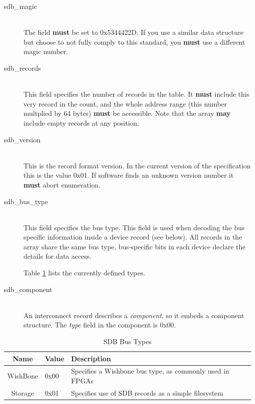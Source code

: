 \documentclass[a4paper, 12pt]{article}
\begin{document}
\begin{description}
\item[sdb\_magic] \hfill \\
The field \textbf{must} be set to 0x5344422D. If you use a similar data structure but
choose to not fully comply to this standard, you \textbf{must} use a different magic
number.

\item[sdb\_records] \hfill \\
This field specifies the number of records in the table. It \textbf{must} include
this very record in the count, and the whole address range (this number multplied by 64 bytes)
\textbf{must} be accessible. Note that the array \textbf{may} include empty records at any position.

\item[sdb\_version] \hfill \\
This is the record format version. In the current version of the specification this is the
value 0x01. If software finds an unknown version number it \textbf{must} abort enumeration.

\item[sdb\_bus\_type] \hfill \\
This field specifies the bus type. This field is used when decoding the bus specific information
inside a device record (see below).  All records in the array share the same
bus type, bus-specific bits in each device declare the details for data access.

Table \ref{bus_type} lists the currently defined types.

\item[sdb\_component] \hfill \\
An interconnect record describes a \textit{component}, so it embeds a component structure.
The \textit{type} field in the component is 0x00.
\end{description}


\begin{center}
  \begin{savenotes}
    \begin{table}[!ht]\footnotesize
      \caption{SDB Bus Types}\label{bus_type}\centering
        \begin{tabular}{| c | l | p{5cm} |} \hline
        Name & Value & Description \\ \hline
        WishBone & 0x00 & Specifies a Wishbone bus type, as commonly used in FPGAs \\ \hline
        Storage & 0x01 & Specifies use of SDB records as a simple filesystem \\ \hline
        \end{tabular}
    \end{table}
  \end{savenotes}
\end{center}
\end{document}
